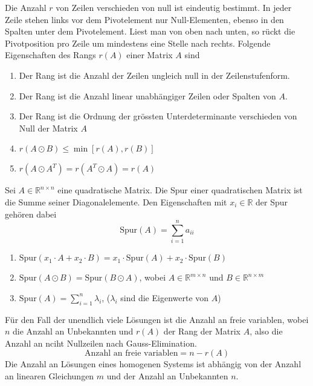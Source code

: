 \newline\newline
Die Anzahl $r$ von Zeilen verschieden von null ist eindeutig bestimmt. In jeder Zeile stehen links vor dem Pivotelement nur Null-Elementen, ebenso in den Spalten unter dem Pivotelement. Liest man von oben nach unten, so rückt die Pivotposition pro Zeile um mindestens eine Stelle nach rechts. Folgende Eigenschaften des Rangs $r(A)$ einer Matrix $A$ sind
\begin{enumerate}[$(i)$]
\item Der Rang ist die Anzahl der Zeilen ungleich null in der Zeilenstufenform.
\item Der Rang ist die Anzahl linear unabhängiger Zeilen oder Spalten von $A$.
\item Der Rang ist die Ordnung der grössten Unterdeterminante verschieden von Null der Matrix $A$
\item $r\left(A\odot B\right)\leq \min\left[r\left(A\right), r\left(B\right)\right]$
\item $r\left(A\odot A^T\right)=r\left(A^T\odot A\right)=r\left(A\right)$
\end{enumerate}
Sei $A\in\mathbb{R}^{n\times n}$ eine quadratische Matrix. Die Spur einer quadratischen Matrix ist die Summe seiner Diagonalelemente. Den Eigenschaften mit $x_i\in \mathbb{R}$ der Spur gehören dabei
\begin{equation}
\boxed{\text{Spur}\left(A\right)=\displaystyle \sum_{i=1}^na_{ii}}
\end{equation}
\begin{enumerate}[$(i)$]
\item $\text{Spur}\left(x_1\cdot A+x_2\cdot B\right)=x_1\cdot \text{Spur}\left(A\right)+x_2\cdot \text{Spur}\left(B\right)$
\item $\text{Spur}\left(A\odot B\right)=\text{Spur}\left(B\odot A\right)$, wobei $A\in\mathbb{R}^{m\times n}$ und $B\in\mathbb{R}^{n\times m}$
\item $\text{Spur}\left(A\right)=\displaystyle \sum_{i=1}^n\lambda_i$, ($\lambda_i$ sind die Eigenwerte von $A$)
\end{enumerate}
Für den Fall der unendlich viele Lösungen ist die Anzahl an freie variablen, wobei $n$ die Anzahl an Unbekannten und $r(A)$ der Rang der Matrix $A$, also die Anzahl an nciht Nullzeilen nach Gauss-Elimination.
\begin{equation}
\boxed{\text{Anzahl an freie variablen} = n-r(A)}
\end{equation}
Die Anzahl an Lösungen eines homogenen Systems ist abhängig von der Anzahl an linearen Gleichungen $m$ und der Anzahl an Unbekannten $n$.
